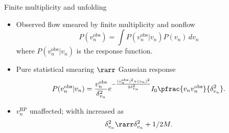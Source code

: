 \documentclass{beamer}
\begin{document}
\begin{frame}[label=unfold]{Finite multiplicity and unfolding}
  \def\obs{^\text{obs}}

  \begin{itemize}
    \item Observed flow smeared by finite multiplicity and nonflow
      \begin{equation*}
        P(v_n\obs) = \int P(v_n\obs|v_n) P(v_n) \, dv_n
      \end{equation*}
      where $P(v_n\obs|v_n)$ is the response function.
    \item Pure statistical smearing $\rarr$ Gaussian response
      \begin{equation*}
        P(v_n^\text{obs}|v_n) = \frac{v_n^\text{obs}}{\delta_{v_n}^2} e^{ -\frac{(v_n^\text{obs})^2 + (v_n)^2}{2\delta_{v_n}^2} }
          I_0 \pfrac{v_nv_n^\text{obs}}{\delta_{v_n}^2}.
      \end{equation*}
    \item $v_n^\text{RP}$ unaffected; width increased as
      \begin{equation*}
        \delta_{v_n}^2 \rarr \delta_{v_n}^2 + 1/2M.
      \end{equation*}
  \end{itemize}

\end{frame}
\end{document}
